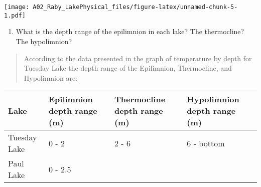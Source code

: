 \documentclass[]{article}
\providecommand{\tightlist}{%
  \setlength{\itemsep}{0pt}\setlength{\parskip}{0pt}}
\begin{document}
\texttt{[image: A02\_Raby\_LakePhysical\_files/figure-latex/unnamed-chunk-5-1.pdf]}

\begin{enumerate}
\def\labelenumi{\arabic{enumi}.}
\setcounter{enumi}{9}
\tightlist
\item
  What is the depth range of the epilimnion in each lake? The
  thermocline? The hypolimnion?
\end{enumerate}

\begin{quote}
According to the data presented in the graph of temperature by depth for
Tuesday Lake the depth range of the Epilimnion, Thermocline, and
Hypolimnion are:
\end{quote}

\begin{longtable}[]{@{}llll@{}}
\toprule
\begin{minipage}[b]{0.25\columnwidth}\raggedright
Lake\strut
\end{minipage} & \begin{minipage}[b]{0.21\columnwidth}\raggedright
Epilimnion depth range (m)\strut
\end{minipage} & \begin{minipage}[b]{0.21\columnwidth}\raggedright
Thermocline depth range (m)\strut
\end{minipage} & \begin{minipage}[b]{0.21\columnwidth}\raggedright
Hypolimnion depth range (m)\strut
\end{minipage}\tabularnewline
\midrule
\endhead
\begin{minipage}[t]{0.25\columnwidth}\raggedright
Tuesday Lake\strut
\end{minipage} & \begin{minipage}[t]{0.21\columnwidth}\raggedright
0 - 2\strut
\end{minipage} & \begin{minipage}[t]{0.21\columnwidth}\raggedright
2 - 6\strut
\end{minipage} & \begin{minipage}[t]{0.21\columnwidth}\raggedright
6 - bottom\strut
\end{minipage}\tabularnewline
\begin{minipage}[t]{0.25\columnwidth}\raggedright
Paul Lake\strut
\end{minipage} & \begin{minipage}[t]{0.21\columnwidth}\raggedright
0 - 2.5\strut
\end{minipage} & \begin{minipage}[t]{0.21\columnwidth}\raggedright

\end{minipage}
\end{longtable}
\end{document}

